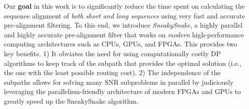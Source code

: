 
Our \textbf{goal} in this work is to significantly reduce the time spent on calculating the sequence alignment of \emph{both short and long sequences} using very fast and accurate pre-alignment filtering. 
To this end, we introduce \emph{SneakySnake}, a highly parallel and highly accurate pre-alignment filter that works on {\emph{modern} high-performance computing architectures such as CPUs, GPUs, and FPGAs}. 
This provides two key benefits. 1) It obviates the need for using computationally costly DP algorithms to keep track of the subpath that provides {the} optimal {solution} (i.e., {the one} with the least possible routing cost).
2) The independence {of} the subpaths allows for solving many SNR subproblems in parallel by judiciously leveraging the parallelism-friendly architecture of modern FPGAs and GPUs to greatly speed up the SneakySnake algorithm.

